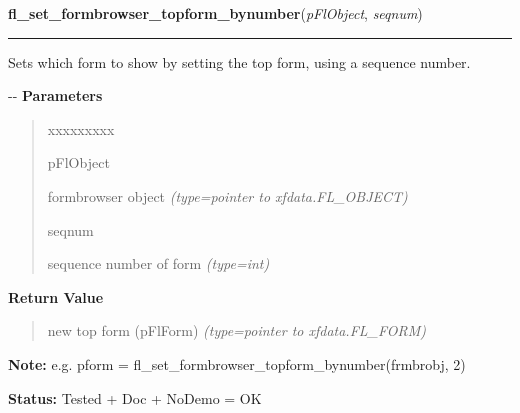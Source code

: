 \hspace{.8\funcindent}\begin{boxedminipage}{\funcwidth}

    \raggedright \textbf{fl\_set\_formbrowser\_topform\_bynumber}(\textit{pFlObject}, \textit{seqnum})

    \vspace{-1.5ex}

    \rule{\textwidth}{0.5\fboxrule}
\setlength{\parskip}{2ex}

Sets which form to show by setting the top form, using a sequence
number.

-{}-
\setlength{\parskip}{1ex}
      \textbf{Parameters}
      \vspace{-1ex}

      \begin{quote}
        \begin{Ventry}{xxxxxxxxx}

          \item[pFlObject]


formbrowser object
            {\it (type=pointer to xfdata.FL\_OBJECT)}

          \item[seqnum]


sequence number of form
            {\it (type=int)}

        \end{Ventry}

      \end{quote}

      \textbf{Return Value}
    \vspace{-1ex}

      \begin{quote}

new top form (pFlForm)
      {\it (type=pointer to xfdata.FL\_FORM)}

      \end{quote}

\textbf{Note:} 
e.g. pform = fl\_set\_formbrowser\_topform\_bynumber(frmbrobj, 2)


\textbf{Status:} 
Tested + Doc + NoDemo = OK


    \end{boxedminipage}

    \label{xformslib:flformbrowser:fl_set_formbrowser_xoffset}

